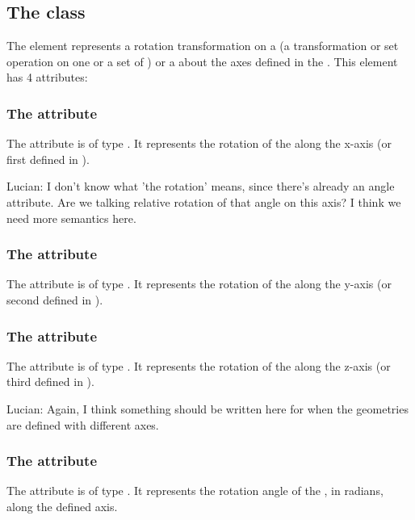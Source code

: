 \subsection{The  class}
\label{CSGRotation-class}
The \CSGRotation element represents a rotation transformation on a \CSGNode (a transformation or set operation on one or a set of \CSGPrimitives) or a \CSGPrimitive about the axes defined in the \Geometry. This element has 4 attributes:

\subsubsection{The  attribute}
The  attribute is of type . It represents the rotation of the \CSGNode along the x-axis (or first \CoordinateComponent defined in \Geometry).

{\color{red} Lucian: \notice I don't know what 'the rotation' means, since there's already an angle attribute.  Are we talking relative rotation of that angle on this axis?  I think we need more semantics here.}

\subsubsection{The  attribute}
The  attribute is of type . It represents the rotation of the \CSGNode along the y-axis (or second \CoordinateComponent defined in \Geometry).

\subsubsection{The  attribute}
The  attribute is of type . It represents the rotation of the \CSGNode along the z-axis (or third \CoordinateComponent defined in \Geometry).

{\color{red} Lucian: \notice Again, I think something should be written here for when the geometries are defined with different axes.}

\subsubsection{The  attribute}
The  attribute is of type . It represents the rotation angle of the \CSGNode, in radians, along the defined axis.



